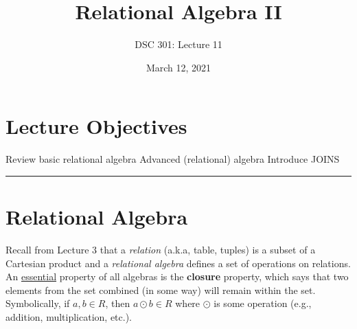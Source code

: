 \documentclass{article}
\newtheorem{definition}{Definition}
\begin{document}
\title{Relational Algebra II}
\author{DSC 301: Lecture 11}
\date{March 12, 2021} %
\maketitle





\begin{outline}[enumerate]

\end{outline}
\begin{outline}
        
\end{outline}




\section*{Lecture Objectives}
\begin{outline}
        \1 Review basic relational algebra
        \1  Advanced (relational) algebra        
        \1  Introduce JOINS
        
       
       
        

\end{outline}

\hspace{-0.5cm}\rule[-0.101in]{\textwidth}{0.0025in}
% 
% 









\section*{Relational Algebra}
 
Recall from Lecture 3 that a \textit{relation} (a.k.a, table, tuples) 
is a subset of a Cartesian product and a \textit{relational algebra} defines a set of operations on relations.  An \underline{essential} property of all algebras  is the \textbf{closure} property, which says that two elements from the set combined (in some way) will remain within the set.  Symbolically, if $a,b \in R$, then $a \odot b \in R$ where $\odot$ is some operation (e.g., addition, multiplication, etc.).          
\end{document}
